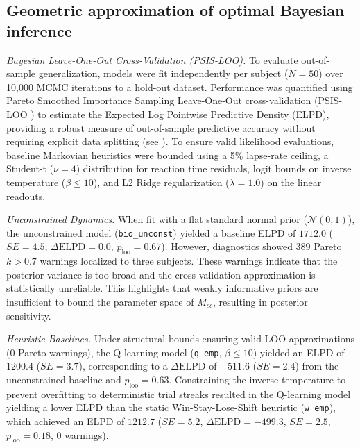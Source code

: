 \documentclass[12pt, a4paper]{extarticle}
\begin{document}
\subsection{Geometric approximation of optimal Bayesian inference}

\textit{Bayesian Leave-One-Out Cross-Validation (PSIS-LOO).} To evaluate out-of-sample generalization, models were fit independently per subject ($N=50$) over 10,000 MCMC iterations to a hold-out dataset. Performance was quantified using Pareto Smoothed Importance Sampling Leave-One-Out cross-validation (PSIS-LOO \parencite{vehtari2017practical}) to estimate the Expected Log Pointwise Predictive Density (ELPD), providing a robust measure of out-of-sample predictive accuracy without requiring explicit data splitting (see ). To ensure valid likelihood evaluations, baseline Markovian heuristics were bounded using a 5\% lapse-rate ceiling, a Student-t ($\nu=4$) distribution for reaction time residuals, logit bounds on inverse temperature ($\beta \le 10$), and L2 Ridge regularization ($\lambda=1.0$) on the linear readouts.

\textit{Unconstrained Dynamics.} When fit with a flat standard normal prior ($\mathcal{N}(0,1)$), the unconstrained model (\texttt{bio\_unconst}) yielded a baseline ELPD of $1712.0$ ($SE = 4.5$, $\Delta\text{ELPD} = 0.0$, $p_{\text{loo}} = 0.67$). However, diagnostics showed 389 Pareto $k > 0.7$ warnings localized to three subjects. These warnings indicate that the posterior variance is too broad and the cross-validation approximation is statistically unreliable. This highlights that weakly informative priors are insufficient to bound the parameter space of $M_{cc}$, resulting in posterior sensitivity.

\textit{Heuristic Baselines.} Under structural bounds ensuring valid LOO approximations (0 Pareto warnings), the Q-learning model (\texttt{q\_emp}, $\beta \le 10$) yielded an ELPD of $1200.4$ ($SE = 3.7$), corresponding to a $\Delta\text{ELPD}$ of $-511.6$ ($SE = 2.4$) from the unconstrained baseline and $p_{\text{loo}} = 0.63$. Constraining the inverse temperature to prevent overfitting to deterministic trial streaks resulted in the Q-learning model yielding a lower ELPD than the static Win-Stay-Lose-Shift heuristic (\texttt{w\_emp}), which achieved an ELPD of $1212.7$ ($SE = 5.2$, $\Delta\text{ELPD} = -499.3$, $SE = 2.5$, $p_{\text{loo}} = 0.18$, 0 warnings).
\end{document}
